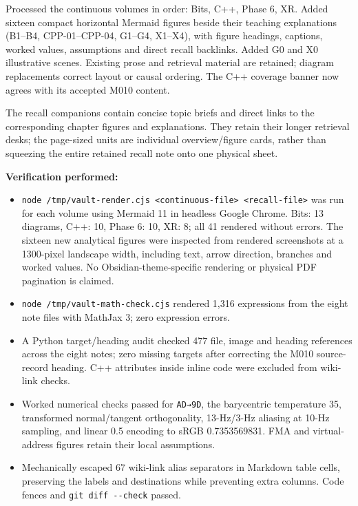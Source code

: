 \hypertarget{appendix-a103e7846d21-visual-revision---2026-10-23}{}

Processed the continuous volumes in order: Bits, C++, Phase 6, XR. Added sixteen compact horizontal Mermaid figures beside their teaching explanations (B1--B4, CPP-01--CPP-04, G1--G4, X1--X4), with figure headings, captions, worked values, assumptions and direct recall backlinks. Added G0 and X0 illustrative scenes. Existing prose and retrieval material are retained; diagram replacements correct layout or causal ordering. The C++ coverage banner now agrees with its accepted M010 content.

The recall companions contain concise topic briefs and direct links to the corresponding chapter figures and explanations. They retain their longer retrieval desks; the page-sized units are individual overview/figure cards, rather than squeezing the entire retained recall note onto one physical sheet.

\textbf{Verification performed:}

\begin{itemize}
\tightlist
\item
  \texttt{node\ /tmp/vault-render.cjs\ \textless{}continuous-file\textgreater{}\ \textless{}recall-file\textgreater{}} was run for each volume using Mermaid 11 in headless Google Chrome. Bits: 13 diagrams, C++: 10, Phase 6: 10, XR: 8; all 41 rendered without errors. The sixteen new analytical figures were inspected from rendered screenshots at a 1300-pixel landscape width, including text, arrow direction, branches and worked values. No Obsidian-theme-specific rendering or physical PDF pagination is claimed.
\item
  \texttt{node\ /tmp/vault-math-check.cjs} rendered 1,316 expressions from the eight note files with MathJax 3; zero expression errors.
\item
  A Python target/heading audit checked 477 file, image and heading references across the eight notes; zero missing targets after correcting the M010 source-record heading. C++ attributes inside inline code were excluded from wiki-link checks.
\item
  Worked numerical checks passed for \texttt{AD→9D}, the barycentric temperature 35, transformed normal/tangent orthogonality, 13-Hz/3-Hz aliasing at 10-Hz sampling, and linear 0.5 encoding to sRGB 0.7353569831. FMA and virtual-address figures retain their local assumptions.
\item
  Mechanically escaped 67 wiki-link alias separators in Markdown table cells, preserving the labels and destinations while preventing extra columns. Code fences and \texttt{git\ diff\ -\/-check} passed.
\end{itemize}

